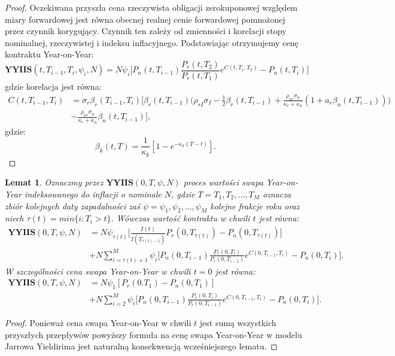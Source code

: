 \documentclass{mini}
\theoremstyle{mythstyle}
\newtheorem{Lemat}{Lemat}[chapter]
\begin{document}
\begin{proof}
	Oczekiwana przyszła cena rzeczywista obligacji zerokuponowej względem miary forwardowej jest równa obecnej realnej cenie forwardowej pomnożonej przez czynnik korygujący. Czynnik ten zależy od zmienności i korelacji stopy nominalnej, rzeczywistej i indeksu inflacyjnego. Podstawiając otrzymujemy cenę kontraktu Year-on-Year:
	\begin{equation*}
	\textbf{YYIIS}(t, T_{i-1},T_i,\psi_i,N) = N \psi_i \bigg[ P_n(t,T_{i-1}) \frac{P_r(t,T_2)}{P_r(t,T_1)} e^{C(t,T_1,T_2)} - P_n(t,T_i) \bigg]
	\end{equation*}
	gdzie korelacja jest równa:
	\begin{align*}
	C(t,T_{i-1},T_i) &= \sigma_r\beta_r(T_{i-1},T_i) \bigg[ \beta_r(t,T_{i-1}) \bigg( \rho_{rI}\sigma_I - \frac{1}{2} \beta_r (t,T_{i-1}) 
	+ \frac{\rho_{nr}\sigma_n}{\kappa_r + \kappa_n} (1+a_r\beta_n(t,T_{i-1})) \bigg)\\&-  \frac{\rho_{nr}\sigma_n}{\kappa_r + \kappa_n} \beta_n(t,T_{i-1}) \bigg],
	\end{align*}
	gdzie:
	\begin{equation*}
	\beta_k(t,T) = \frac{1}{\kappa_k} [1 - e^{-\kappa_k(T-t)}].
	\end{equation*}
	\end{proof}
\pagebreak
	\begin{Lemat}
	Oznaczmy przez $\textbf{YYIIS} (0,T,\psi,N)$ proces wartości swapa Year-on-Year indeksowanego do inflacji o nominale $N$, gdzie $T= {T_1,T_2,...,T_M}$ oznacza zbiór kolejnych  daty zapadalności zaś $\psi = {\psi_1,\psi_2,...,\psi_M}$ kolejne frakcje roku oraz niech $ \tau(t) = min\{i: T_i  > t\}$. Wówczas wartość kontraktu w chwili $t$ jest równa: 
		\begin{align*}
		\textbf{YYIIS} (0,T,\psi,N) &= N\psi_{\tau(t)}\bigg[\frac{I(t)}{I(T_{\tau(t)-1})}P_r(0,T_{\tau(t)}) - P_n(0,T_{\tau(t)})] \\
		&+ N\sum_{i=\tau(t)+1}^{M} \psi_i \bigg[ P_n(0,T_{i-1}) \frac{P_r(0,T_i)}{P_r(0,T_{i-1})}e^{C(0,T_{i-1},T_i)} - P_n(0,T_i) \bigg]. 
		\end{align*}
		W szczególności cena swapa Year-on-Year w chwili $t = 0$ jest równa:
		\begin{align}
			\textbf{YYIIS} (0,T,\psi,N) &= N\psi_1[P_r(0.T_1) - P_n(0,T_1)] \\
			&+ N\sum_{i=2}^{M} \psi_i \bigg[ P_n(0,T_{i-1}) \frac{P_r(0,T_i)}{P_r(0,T_{i-1})}e^{C(0,T_{i-1},T_i)} - P_n(0,T_i) \bigg]. 
		\end{align}
	\end{Lemat}
\begin{proof}
		Ponieważ cena swapa Year-on-Year w chwili $t$ jest sumą wszystkich przyszłych przepływów powyższy formuła na cenę swapa Year-on-Year w modelu Jarrowa Yieldirima jest naturalną konsekwencją wcześniejszego lematu.
\end{proof}
\end{document}
